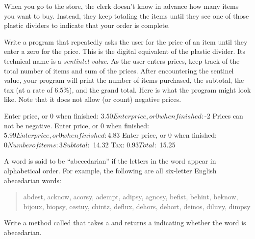 \begin{exercise}
When you go to the store, the clerk doesn't know in advance how many items you want to buy. Instead, they keep totaling the items until they see one of those plastic dividers to indicate that your order is complete.

Write a program that repeatedly asks the user for the price of an item until they enter a zero for the price. This is the digital equivalent of the plastic divider. Its technical name is a {\em sentintel value}. As the user enters prices, keep track of the total number of items and sum of the prices.  After encountering the sentinel value, your program will print the number of items purchased, the subtotal, the tax (at a rate of 6.5\%), and the grand total. Here is what the program might look like. Note that it does not allow (or count) negative prices.

\begin{stdout}
Enter price, or 0 when finished: $3.50    
Enter price, or 0 when finished: $-2
Prices can not be negative.
Enter price, or 0 when finished: $5.99
Enter price, or 0 when finished: $4.83
Enter price, or 0 when finished: $0

Number of items: 3
Subtotal:  $   14.32
Tax:       $    0.93
Total:     $   15.25
\end{stdout}
\end{exercise}

\begin{exercise}  %


A word is said to be ``abecedarian'' if the letters in the word appear in alphabetical order.
For example, the following are all six-letter English abecedarian words:

\begin{quote}
abdest, acknow, acorsy, adempt, adipsy, agnosy, befist, behint, %
beknow, bijoux, biopsy, cestuy, chintz, deflux, dehors, dehort, %
deinos, diluvy, dimpsy %
\end{quote}

Write a method called  that takes a  and returns a  indicating whether the word is abecedarian.

\end{exercise}


